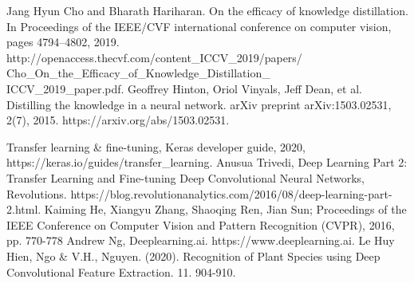 \documentclass[conference]{IEEEtran}
\begin{document}
\begin{thebibliography}{00}


 Jang Hyun Cho and Bharath Hariharan. On the efficacy of knowledge distillation. In Proceedings of the IEEE/CVF international conference on computer vision, pages 4794–4802, 2019. http://openaccess.thecvf.com/content\_ICCV\_2019/papers/\\Cho\_On\_the\_Efficacy\_of\_Knowledge\_Distillation\_\\ICCV\_2019\_paper.pdf.
 Geoffrey Hinton, Oriol Vinyals, Jeff Dean, et al. Distilling the knowledge in a neural network. arXiv preprint arXiv:1503.02531, 2(7), 2015. https://arxiv.org/abs/1503.02531.

 Transfer learning \& fine-tuning, Keras developer guide, 2020, https://keras.io/guides/transfer\_learning.
 Anusua Trivedi, Deep Learning Part 2: Transfer Learning and Fine-tuning Deep Convolutional Neural Networks, Revolutions. https://blog.revolutionanalytics.com/2016/08/deep-learning-part-2.html.
 Kaiming He, Xiangyu Zhang, Shaoqing Ren, Jian Sun; Proceedings of the IEEE Conference on Computer Vision and Pattern Recognition (CVPR), 2016, pp. 770-778
 Andrew Ng, Deeplearning.ai. https://www.deeplearning.ai.
Le Huy Hien, Ngo \& V.H., Nguyen. (2020). Recognition of Plant Species using Deep Convolutional Feature Extraction. 11. 904-910.
\end{thebibliography}
\end{document}
